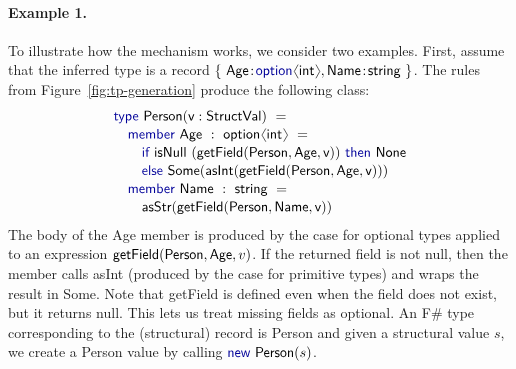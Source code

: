 \documentclass[10pt,preprint,blind,clearpagebib]{sigplanconf}
\newcommand{\langl}{\begin{picture}(4.5,7)
\put(1.1,2.5){\rotatebox{60}{\line(1,0){5.5}}}
\put(1.1,2.5){\rotatebox{300}{\line(1,0){5.5}}}
\end{picture}}
\newcommand{\rangl}{\begin{picture}(4.5,7)
\put(.9,2.5){\rotatebox{120}{\line(1,0){5.5}}}
\put(.9,2.5){\rotatebox{240}{\line(1,0){5.5}}}
\end{picture}}
\newcommand{\kvd}[1]{\textnormal{\textcolor{kvdclr}{\sffamily #1}}}
\newcommand{\ident}[1]{\textnormal{\sffamily #1}}
\begin{document}
\paragraph{Example 1.}
To illustrate how the mechanism works, we consider two examples. First, assume 
that the inferred type is a record  
$\{~\ident{Age}\!:\!\kvd{option}\langl\ident{int}\rangl, \ident{Name}\!:\!\ident{string}~ \}$. 
The rules from Figure~\ref{fig:tp-generation} produce the following class:
%
\begin{equation*}
\begin{array}{l}
 \kvd{type}~\ident{Person}(\ident{v}:\ident{StructVal})~= \\[0.1em]
 \quad \kvd{member}~\ident{Age}~:~\ident{option}\langl\ident{int}\rangl~= \\[0.1em]
 \qquad \kvd{if}~\ident{isNull}~(\ident{getField}(\ident{Person},\ident{Age}, \ident{v}))~\kvd{then}~\ident{None} \\[0.1em]
 \qquad \kvd{else}~\ident{Some}(\ident{asInt}(\ident{getField}(\ident{Person},\ident{Age}, \ident{v}))) \\[0.1em]
 \quad \kvd{member}~\ident{Name}~:~\ident{string}~= \\[0.1em]
 \qquad \ident{asStr}(\ident{getField}(\ident{Person},\ident{Name}, \ident{v}))
\end{array}
\end{equation*}
%
The body of the \ident{Age} member is produced by the case for optional types applied to an expression
$\ident{getField}(\ident{Person},\ident{Age},v)$. If the returned field is not \kvd{null}, then the member
calls \ident{asInt} (produced by the case for primitive types) and wraps the result in \ident{Some}.
Note that \ident{getField} is defined even when the field does not exist, but it returns 
\kvd{null}. This lets us treat missing fields as optional. An F\# type corresponding to the (structural)
record is \ident{Person} and given a structural value $s$, we create a \ident{Person} value by calling 
$\kvd{new}~\ident{Person}(s)$.
\end{document}

